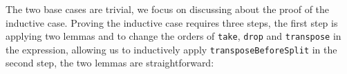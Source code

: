 \documentclass{l4proj}
\begin{document}
\begin{code}
\AgdaSymbol{)}\AgdaSpace{}%
\AgdaSymbol{)}\AgdaSpace{}%
\AgdaSymbol{)}\<%
\\
\>[2][@{}l@{\AgdaIndent{0}}]%
\>[4]\AgdaSymbol{(}\AgdaSpace{}%
\AgdaSpace{}%
\AgdaSymbol{(}\AgdaSpace{}%
\AgdaSymbol{(}\AgdaSpace{}%
\AgdaSymbol{)}\AgdaSpace{}%
\AgdaSymbol{))}\AgdaSpace{}%
\<%
\\
%
\>[4]\AgdaSpace{}%
\AgdaSymbol{(}\AgdaSpace{}%
\AgdaSymbol{(}\AgdaSpace{}%
\AgdaSymbol{)}\AgdaSpace{}%
\AgdaSymbol{)}\AgdaSpace{}%
\<%
\\
%
\>[4]\AgdaSpace{}%
\AgdaSpace{}%
\AgdaSymbol{(}\AgdaSpace{}%
\AgdaSymbol{(}\AgdaSpace{}%
\AgdaSymbol{(}\AgdaSpace{}%
\AgdaSymbol{)}\AgdaSpace{}%
\AgdaSymbol{(}\AgdaSpace{}%
\AgdaSymbol{(}\AgdaSpace{}%
\AgdaSymbol{)}\AgdaSpace{}%
\AgdaSymbol{)))}\<%
\\
%
\>[2]\AgdaSpace{}%
\AgdaSpace{}%
\AgdaSymbol{(}\AgdaSpace{}%
\AgdaSpace{}%
\AgdaSymbol{)}\AgdaSpace{}%
\<%
\\
\>[2][@{}l@{\AgdaIndent{0}}]%
\>[4]\<%
\end{code}
The two base cases are trivial, we focus on discussing about the proof of the inductive case. Proving the inductive case requires three steps, the first step is applying two lemmas  and  to change the orders of \texttt{take}, \texttt{drop} and \texttt{transpose} in the expression, allowing us to inductively apply \texttt{transposeBeforeSplit} in the second step, the two lemmas are straightforward:
\end{document}
